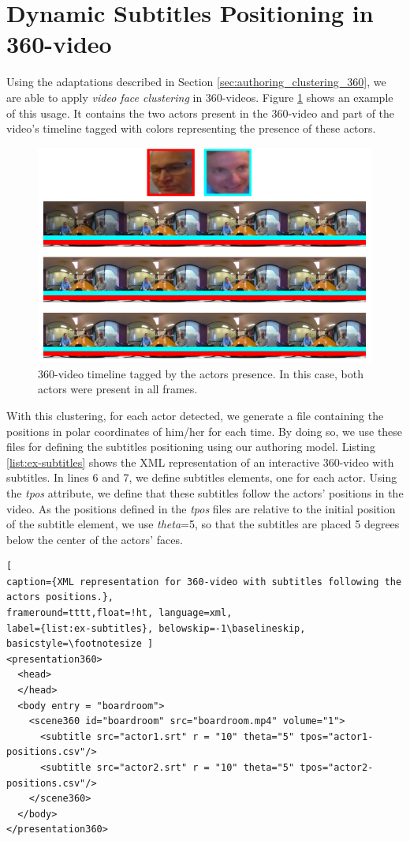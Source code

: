 \section{Dynamic Subtitles Positioning in 360-video}
\label{sec:authoring_discussion}

Using the adaptations described in Section \ref{sec:authoring_clustering_360}, we are able to apply \emph{video face clustering} in 360-videos. Figure \ref{fig:360_video_timeline} shows an example of this usage. It contains the two actors present in the 360-video and part of the video's timeline tagged with colors representing the presence of these actors.

\begin{figure}[!ht]
    \centering
    \includegraphics[width=0.88\linewidth]{img/video360/timeline-360.png}
    \caption{360-video timeline tagged by the actors presence. In this case, both actors were present in all frames.}
    \label{fig:360_video_timeline}
\end{figure}

With this clustering, for each actor detected, we generate a file containing the positions in polar coordinates of him/her for each time. By doing so, we use these files for defining the subtitles positioning using our authoring model. Listing \ref{list:ex-subtitles} shows the XML representation of an interactive 360-video with subtitles. In lines 6 and 7, we define subtitles elements, one for each actor. Using the \emph{tpos} attribute, we define that these subtitles follow the actors' positions in the video. As the positions defined in the \emph{tpos} files are relative to the initial position of the subtitle element, we use \emph{theta}=5, so that the subtitles are placed 5 degrees below the center of the actors' faces.


\begin{lstlisting}[
caption={XML representation for 360-video with subtitles following the actors positions.},
frameround=tttt,float=!ht, language=xml, 
label={list:ex-subtitles}, belowskip=-1\baselineskip, basicstyle=\footnotesize ]
<presentation360>
  <head>
  </head>
  <body entry = "boardroom">
    <scene360 id="boardroom" src="boardroom.mp4" volume="1">   
      <subtitle src="actor1.srt" r = "10" theta="5" tpos="actor1-positions.csv"/>      
      <subtitle src="actor2.srt" r = "10" theta="5" tpos="actor2-positions.csv"/>
    </scene360>
  </body>
</presentation360>
\end{lstlisting}

